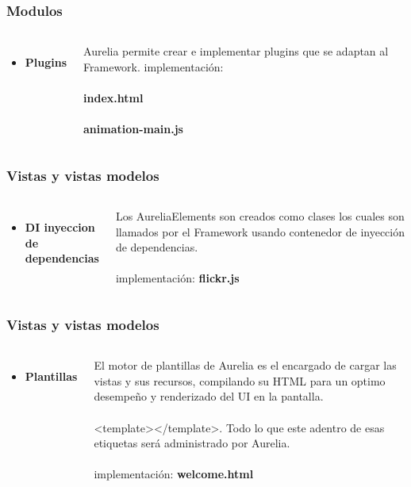 \documentclass{beamer}
\begin{document}
\begin{frame}
\frametitle{Modulos}
\begin{columns}[c]
\begin{itemize}
\item \textbf{Plugins}
\end{itemize}
Aurelia permite crear e implementar plugins que se adaptan al Framework.
implementaci\'on:
\\~\\
\textbf{index.html}
\\~\\
\textbf{animation-main.js}
\end{columns}
\end{frame}
\begin{frame}
\frametitle{Vistas y vistas modelos}
\begin{columns}[c]
\begin{itemize}
\item \textbf{DI inyeccion de dependencias}
\end{itemize}
Los AureliaElements son creados como clases los cuales son llamados por el Framework usando contenedor de inyecci\'on de dependencias.
\\~\\
implementaci\'on: \textbf{flickr.js}
\end{columns}
\end{frame}
\begin{frame}
\frametitle{Vistas y vistas modelos}
\begin{columns}[c]
\begin{itemize}
\item \textbf{Plantillas}
\end{itemize}
El motor de plantillas de Aurelia es el encargado de cargar las vistas y sus recursos, compilando su HTML para un optimo desempe\~no y renderizado del UI en la pantalla.
\\~\\
\textless template\textgreater \textless /template\textgreater. Todo lo que este adentro de esas etiquetas ser\'a administrado por Aurelia.
\\~\\
implementaci\'on: \textbf{welcome.html}
\end{columns}
\end{frame}
\end{document}
